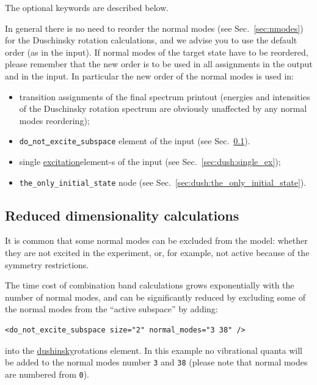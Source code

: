 \documentclass[11pt]{article}
\begin{document}
The optional keywords are described below.

In general there is no need to reorder the normal modes (see Sec.~\ref{sec:nmodes}) 
for the Duschinsky rotation calculations, 
and we advise you to use the default order (as in the \ai input).
If normal modes of the target state have to be reordered,
please remember that the new order is to be used in all assignments in the output 
and in the input.
In particular the new order of the normal modes is used in:
\begin{itemize}
\item transition assignments of the final spectrum printout (energies and intensities of the 
Duschinsky rotation spectrum are obviously unaffected by any normal modes reordering);
\item {\tt do\underline{~}not\underline{~}excite\underline{~}subspace} element of the input (see Sec.~\ref{sec:dush:subspace}).
\item single \ul{excitation}{element}-s of the input (see Sec.~\ref{sec:dush:single_ex});
\item {\tt the\_only\_initial\_state} node  (see Sec.~\ref{sec:dush:the_only_initial_state}).
\end{itemize}

\subsection{Reduced dimensionality calculations}
\label{sec:dush:subspace}

It is common that some normal modes can be excluded from the model: whether they are not excited in the experiment,
or, for example, not active because of the symmetry restrictions. 

The time cost of combination band calculations grows exponentially with the number of normal modes, 
and can be significantly reduced by excluding some of the normal modes from the ``active subspace'' 
by adding:
\begin{lstlisting}[frame=single,framerule=0pt]
   <do_not_excite_subspace size="2" normal_modes="3 38" />
\end{lstlisting}
into the \ul{dushinsky}{rotations} element. In this example no vibrational quanta will be added to 
the normal modes number {\tt 3} and {\tt 38} (please note that normal modes are numbered from {\tt 0}).

\end{document}
